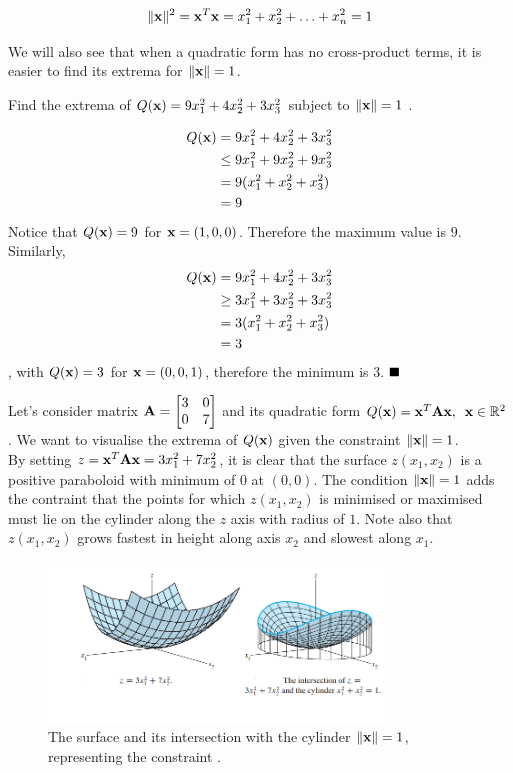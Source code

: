 \documentclass[a4paper]{article}
\numberwithin{equation}{section} %
\newcommand{\setR}{\mathbb{R}} %
\newcommand{\norm}[1] {\lVert #1 \rVert} %
\newcommand{\qedblack}{$\hfill\blacksquare$} %
\newcommand{\hquad}{\hskip0.5em\relax}%
\newcommand{\B}[1]{\textbf{\textup{#1}}} %
\begin{document}
\begin{equation}
\norm{\B{x}}^2=\B{x}^{T}\B{x}=x_1^2+x_2^2+\ldots+x_n^2=1
\end{equation}

We will also see that when a quadratic form has no cross-product terms, it is easier to find its extrema for $\norm{\B{x}}=1$.

\begin{exmp}
Find the extrema of $Q(\B{x})=9x_1^2+4x_2^2+3x_3^2$ subject to $\norm{\B{x}}=1$ \cite{lay}.
\end{exmp}

\begin{TheSolution}
\[
\begin{split}
Q(\B{x}) &= 9x_1^2+4x_2^2+3x_3^2 \\
&\leq 9x_1^2+9x_2^2+9x_3^2\\
&= 9(x_1^2+x_2^2+x_3^2)\\
&= 9
\end{split}
\]
Notice that $Q(\B{x})=9$ for $\B{x}=(1,0,0)$. Therefore the maximum value is $9$. Similarly,
\[
\begin{split}
Q(\B{x}) &= 9x_1^2+4x_2^2+3x_3^2 \\
&\geq 3x_1^2+3x_2^2+3x_3^2\\
&= 3(x_1^2+x_2^2+x_3^2)\\
&= 3
\end{split}
\]
, with $Q(\B{x})=3$ for $\B{x}=(0,0,1)$, therefore the minimum is $3$. \qedblack
\end{TheSolution}

Let's consider matrix $\B{A}=\begin{bmatrix}3 & 0\\0 & 7\end{bmatrix}$ and its quadratic form $Q(\B{x})=\B{x}^{T}\B{Ax}, \hquad \B{x} \in \setR ^2$. We want to visualise the extrema of $Q(\B{x})$ given the constraint $\norm{\B{x}}=1$.\\
By setting $z=\B{x}^{T}\B{Ax}=3x_1^2+7x_2^2$, it is clear that the surface $z(x_1,x_2)$ is a positive paraboloid with minimum of 0 at $(0,0)$. The condition $\norm{\B{x}}=1$ adds the contraint that the points for which $z(x_1,x_2)$ is minimised or maximised must lie on the cylinder along the $z$ axis with radius of $1$. Note also that $z(x_1,x_2)$ grows fastest in height along axis $x_2$ and slowest along $x_1$.\\

\begin{figure}[H]
	\centering %
	\includegraphics[height=4.25cm]{opt_01.PNG}
    \caption{The surface and its intersection with the cylinder $\norm{\B{x}}=1$, representing the constraint \cite{lay}.}
    \label{fig:conics4}
\end{figure}
\end{document}

